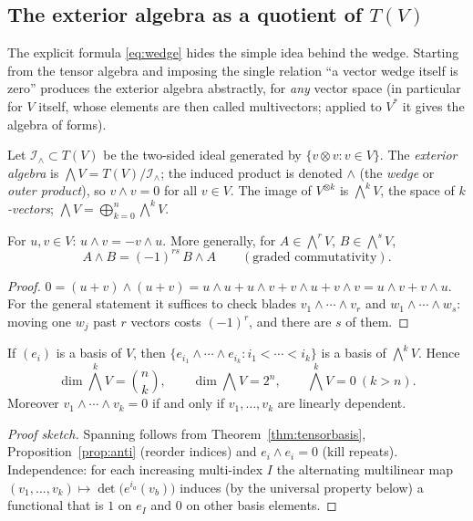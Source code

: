 \subsection{The exterior algebra as a quotient of $T(V)$}\label{sec:extquotient}

The explicit formula \eqref{eq:wedge} hides the simple idea behind the wedge. Starting from the tensor algebra and imposing the
single relation ``a vector wedge itself is zero'' produces the exterior algebra abstractly, for \emph{any} vector space
(in particular for $V$ itself, whose elements are then called multivectors; applied to $V^*$ it gives the algebra of forms).
\begin{definition}
Let $\mathcal I_\wedge\subset T(V)$ be the two-sided ideal generated by $\{v\otimes v: v\in V\}$.
The \emph{exterior algebra} is $\bigwedge V=T(V)/\mathcal I_\wedge$; the induced product is denoted $\wedge$
(the \emph{wedge} or \emph{outer product}), so $v\wedge v=0$ for all $v\in V$. The image of $V^{\otimes k}$ is
$\bigwedge^kV$, the space of \emph{$k$-vectors}; $\bigwedge V=\bigoplus_{k=0}^n\bigwedge^kV$.
\end{definition}

\begin{proposition}[Anticommutativity]\label{prop:anti}
For $u,v\in V$: $u\wedge v=-v\wedge u$. More generally, for $A\in\bigwedge^rV$, $B\in\bigwedge^sV$,
\[
 A\wedge B=(-1)^{rs}\,B\wedge A\qquad(\text{graded commutativity}).
\]
\end{proposition}
\begin{proof}
$0=(u+v)\wedge(u+v)=u\wedge u+u\wedge v+v\wedge u+v\wedge v=u\wedge v+v\wedge u$. For the general statement it suffices
to check blades $v_1\wedge\cdots\wedge v_r$ and $w_1\wedge\cdots\wedge w_s$: moving one $w_j$ past $r$ vectors costs $(-1)^r$,
and there are $s$ of them.
\end{proof}

\begin{theorem}\label{thm:extbasis}
If $(e_i)$ is a basis of $V$, then $\{e_{i_1}\wedge\cdots\wedge e_{i_k}: i_1<\cdots<i_k\}$ is a basis of $\bigwedge^kV$. Hence
\[
 \dim\textstyle\bigwedge^kV=\binom nk,\qquad\dim\bigwedge V=2^n,\qquad \bigwedge^kV=0\ (k>n).
\]
Moreover $v_1\wedge\cdots\wedge v_k=0$ if and only if $v_1,\dots,v_k$ are linearly dependent.
\end{theorem}
\begin{proof}[Proof sketch]
Spanning follows from Theorem~\ref{thm:tensorbasis}, Proposition~\ref{prop:anti} (reorder indices) and $e_i\wedge e_i=0$ (kill repeats).
Independence: for each increasing multi-index $I$ the alternating multilinear map $(v_1,\dots,v_k)\mapsto\det\bigl(e^{i_a}(v_b)\bigr)$ induces (by
the universal property below) a functional that is $1$ on $e_I$ and $0$ on other basis elements.
\end{proof}

